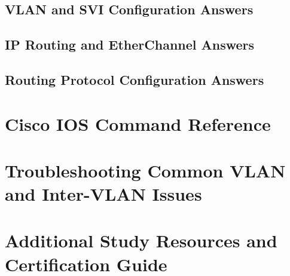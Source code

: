 \documentclass[a4paper]{book}
\begin{document}
\section{VLAN and SVI Configuration Answers}
\section{IP Routing and EtherChannel Answers}
\section{Routing Protocol Configuration Answers}

\appendix
\chapter{Cisco IOS Command Reference}
\chapter{Troubleshooting Common VLAN and Inter-VLAN Issues}
\chapter{Additional Study Resources and Certification Guide}
\end{document}
